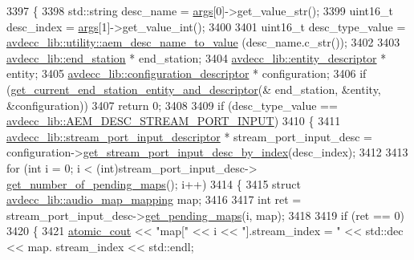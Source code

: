 \begin{DoxyCode}
3397 \{
3398     std::string desc\_name = \hyperlink{namespaceastime__fitline_a8187411843a6284ffb964ef3fb9fcab3}{args}[0]->get\_value\_str();
3399     uint16\_t desc\_index = \hyperlink{namespaceastime__fitline_a8187411843a6284ffb964ef3fb9fcab3}{args}[1]->get\_value\_int();
3400 
3401     uint16\_t desc\_type\_value = \hyperlink{namespaceavdecc__lib_1_1utility_a9f6076e32fa227555a95b6e95ea1e29b}{avdecc\_lib::utility::aem\_desc\_name\_to\_value}
      (desc\_name.c\_str());
3402 
3403     \hyperlink{classavdecc__lib_1_1end__station}{avdecc\_lib::end\_station} * end\_station;
3404     \hyperlink{classavdecc__lib_1_1entity__descriptor}{avdecc\_lib::entity\_descriptor} * entity;
3405     \hyperlink{classavdecc__lib_1_1configuration__descriptor}{avdecc\_lib::configuration\_descriptor} * configuration;
3406     \textcolor{keywordflow}{if} (\hyperlink{classcmd__line_ac2d4611fba7db03d436a2e3c1e64828e}{get\_current\_end\_station\_entity\_and\_descriptor}(&
      end\_station, &entity, &configuration))
3407         \textcolor{keywordflow}{return} 0;
3408 
3409     \textcolor{keywordflow}{if} (desc\_type\_value == \hyperlink{namespaceavdecc__lib_ac7b7d227e46bc72b63ee9e9aae15902fa54a680de439da84c5d5037a246d55b3f}{avdecc\_lib::AEM\_DESC\_STREAM\_PORT\_INPUT})
3410     \{
3411         \hyperlink{classavdecc__lib_1_1stream__port__input__descriptor}{avdecc\_lib::stream\_port\_input\_descriptor} * 
      stream\_port\_input\_desc = configuration->\hyperlink{classavdecc__lib_1_1configuration__descriptor_ad05646251e84a4024f317dd82395b8f7}{get\_stream\_port\_input\_desc\_by\_index}(desc\_index);
3412 
3413         \textcolor{keywordflow}{for} (\textcolor{keywordtype}{int} i = 0; i < (int)stream\_port\_input\_desc->
      \hyperlink{classavdecc__lib_1_1stream__port__input__descriptor_ab97aa51efdb274b6226d04c41f2d974e}{get\_number\_of\_pending\_maps}(); i++)
3414         \{
3415             \textcolor{keyword}{struct }\hyperlink{structavdecc__lib_1_1audio__map__mapping}{avdecc\_lib::audio\_map\_mapping} map;
3416 
3417             \textcolor{keywordtype}{int} ret = stream\_port\_input\_desc->\hyperlink{classavdecc__lib_1_1stream__port__input__descriptor_aaa56e01b09f3ff3f29037216607e556e}{get\_pending\_maps}(i, map);
3418 
3419             \textcolor{keywordflow}{if} (ret == 0)
3420             \{
3421                 \hyperlink{cmd__line_8h_a0bc38ccc65c79ba06c6fcd7b4bf554c3}{atomic\_cout} << \textcolor{stringliteral}{"map["} << i << \textcolor{stringliteral}{"].stream\_index = "} << std::dec << map.
      stream\_index << std::endl;

\end{DoxyCode}

